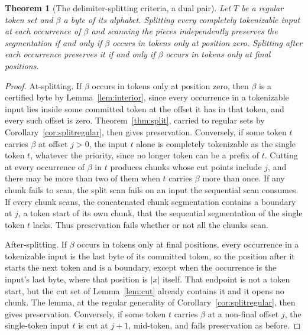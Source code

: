 \documentclass[11pt,a4paper]{article}
\theoremstyle{definition}
\theoremstyle{plain}
\newtheorem{theorem}{Theorem}
\begin{document}
\begin{theorem}[The delimiter-splitting criteria, a dual pair]\label{thm:delimiter}
Let $T$ be a regular token set and $\beta$ a byte of its alphabet. Splitting every completely tokenizable input
\emph{at} each occurrence of $\beta$ and scanning the pieces independently preserves the segmentation if and only if
$\beta$ occurs in tokens only at position zero. Splitting \emph{after} each occurrence preserves it if and only if
$\beta$ occurs in tokens only at final positions.
\end{theorem}

\begin{proof}
At-splitting. If $\beta$ occurs in tokens only at position zero, then $\beta$ is a certified byte by
Lemma~\ref{lem:interior}, since every occurrence in a tokenizable input lies inside some committed token at the offset
it has in that token, and every such offset is zero. Theorem~\ref{thm:split}, carried to regular sets by
Corollary~\ref{cor:splitregular}, then gives preservation. Conversely, if some token $t$ carries $\beta$ at offset
$j > 0$, the input $t$ alone is completely tokenizable as the single token $t$, whatever the priority, since no longer
token can be a prefix of $t$. Cutting at every occurrence of $\beta$ in $t$ produces chunks whose cut points include
$j$, and there may be more than two of them when $t$ carries $\beta$ more than once. If any chunk fails to scan, the
split scan fails on an input the sequential scan consumes. If every chunk scans, the concatenated chunk segmentation
contains a boundary at $j$, a token start of its own chunk, that the sequential segmentation of the single token $t$
lacks. Thus preservation fails whether or not all the chunks scan.

After-splitting. If $\beta$ occurs in tokens only at final positions, every occurrence in a tokenizable input is the
last byte of its committed token, so the position after it starts the next token and is a boundary, except when the
occurrence is the input's last byte, where that position is $|x|$ itself. That endpoint is not a token start, but the
cut set of Lemma~\ref{lem:cut} already contains it and it opens no chunk. The lemma, at the regular generality of
Corollary~\ref{cor:splitregular}, then gives preservation. Conversely, if some token $t$ carries $\beta$ at a non-final
offset $j$, the single-token input $t$ is cut at $j + 1$, mid-token, and fails preservation as before.
\end{proof}
\end{document}
